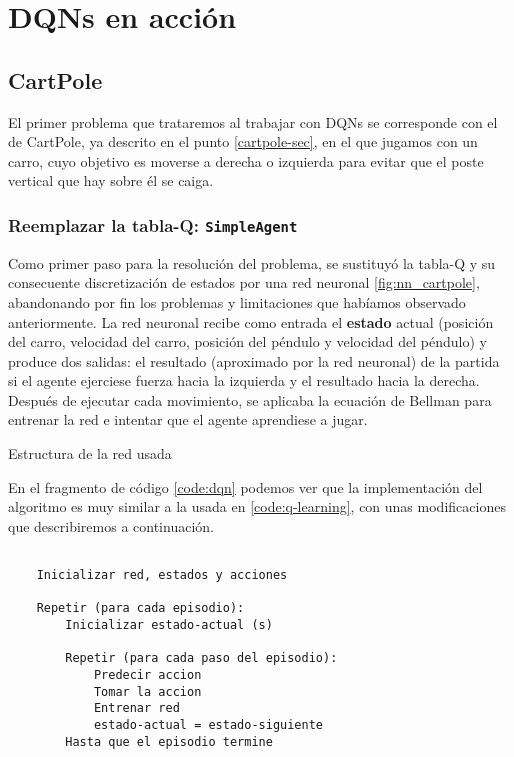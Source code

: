 \chapter{DQNs en acción}
\label{cap:dqnEnAccion}



\section{CartPole}
\label{sec:cartpoleDQN}

El primer problema que trataremos al trabajar con DQNs se corresponde con el de CartPole, ya descrito en el punto \ref{cartpole-sec}, en el que jugamos con un carro, cuyo objetivo es moverse a derecha o izquierda para evitar que el poste vertical que hay sobre él se caiga.


\subsection{Reemplazar la tabla-Q: \texttt{SimpleAgent}}

Como primer paso para la resolución del problema, se sustituyó la tabla-Q y su consecuente discretización de estados por una red neuronal \ref{fig:nn_cartpole}, abandonando por fin los problemas y limitaciones que habíamos observado anteriormente. La red neuronal recibe como entrada el \textbf{estado} actual (posición del carro, velocidad del carro, posición del péndulo y velocidad del péndulo) y produce dos salidas: el resultado (aproximado por la red neuronal) de la partida si el agente ejerciese fuerza hacia la izquierda y el resultado hacia la derecha. Después de ejecutar cada movimiento, se aplicaba la ecuación de Bellman para entrenar la red e intentar que el agente aprendiese a jugar.

%
       {Estructura de la red usada}

En el fragmento de código \ref{code:dqn} podemos ver que la implementación del algoritmo es muy similar a la usada en \ref{code:q-learning}, con unas modificaciones que describiremos a continuación.

\begin{minipage}{0.9\linewidth}%
    \begin{lstlisting}[frame=tb, caption=Pseudocódigo SimpleAgent, inputencoding=latin1, label=code:dqn]
    
    Inicializar red, estados y acciones
    
    Repetir (para cada episodio):
        Inicializar estado-actual (s)
        
        Repetir (para cada paso del episodio):
            Predecir accion
            Tomar la accion
            Entrenar red
            estado-actual = estado-siguiente
        Hasta que el episodio termine
    \end{lstlisting}%
\end{minipage}

